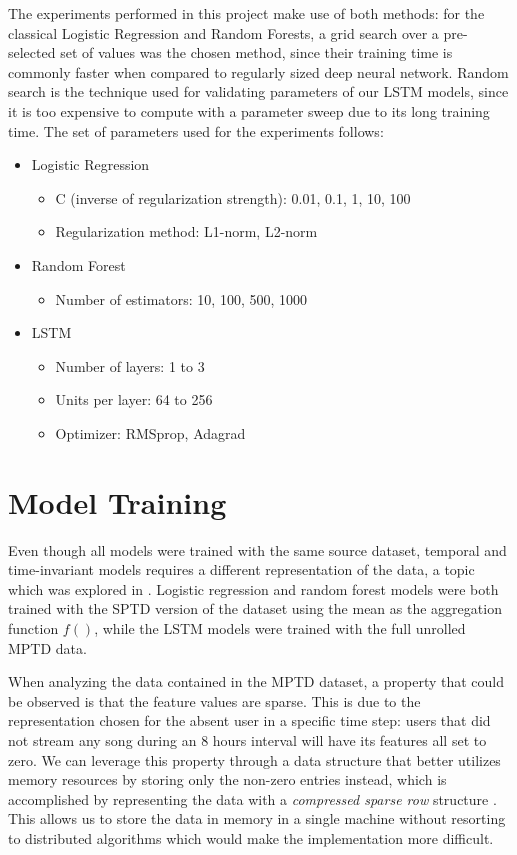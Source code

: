 \documentclass{kththesis}
\begin{document}
The experiments performed in this project make use of both methods: for the classical Logistic Regression and Random Forests, a grid search over a pre-selected set of values was the chosen method, since their training time is commonly faster when compared to regularly sized deep neural network. Random search is the technique used for validating parameters of our LSTM models, since it is too expensive to compute with a parameter sweep due to its long training time. The set of parameters used for the experiments follows:

\begin{itemize}
\item Logistic Regression
\begin{itemize}
\item C (inverse of regularization strength): 0.01, 0.1, 1, 10, 100
\item Regularization method: L1-norm, L2-norm
\end{itemize}
\item Random Forest
\begin{itemize}
\item Number of estimators: 10, 100, 500, 1000
\end{itemize}
\item LSTM
\begin{itemize}
\item Number of layers: 1 to 3
\item Units per layer: 64 to 256
\item Optimizer: RMSprop, Adagrad
\end{itemize}
\end{itemize}

\section{Model Training}

Even though all models were trained with the same source dataset, temporal and time-invariant models requires a different representation of the data, a topic which was explored in . Logistic regression and random forest models were both trained with the SPTD version of the dataset using the mean as the aggregation function $f()$, while the LSTM models were trained with the full unrolled MPTD data.

When analyzing the data contained in the MPTD dataset, a property that could be observed is that the feature values are sparse. This is due to the representation chosen for the absent user in a specific time step: users that did not stream any song during an 8 hours interval will have its features all set to zero. We can leverage this property through a data structure that better utilizes memory resources by storing only the non-zero entries instead, which is accomplished by representing the data with a \emph{compressed sparse row} structure \citep{bulucc2009parallel}. This allows us to store the data in memory in a single machine without resorting to distributed algorithms which would make the implementation more difficult.
\end{document}
